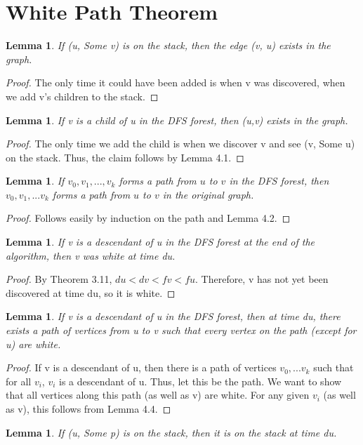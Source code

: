 \documentclass{article}
\newtheorem{lemma}[theorem]{Lemma}
\begin{document}
\section{White Path Theorem}
\begin{lemma}
If (u, Some v) is on the stack, then the edge (v, u) exists in the graph.
\end{lemma}
\begin{proof}
The only time it could have been added is when v was discovered, when we add v's children to the stack.
\end{proof}
\begin{lemma}
If v is a child of u in the DFS forest, then (u,v) exists in the graph.
\end{lemma}
\begin{proof}
The only time we add the child is when we discover v and see (v, Some u) on the stack. Thus, the claim follows by Lemma 4.1.
\end{proof}
\begin{lemma}
If $v_0, v_1,...,v_k$ forms a path from $u$ to $v$ in the DFS forest, then $v_0,v_1,...v_k$ forms a path from $u$ to $v$ in the original graph.
\end{lemma}
\begin{proof}
Follows easily by induction on the path and Lemma 4.2.
\end{proof}
\begin{lemma}
If v is a descendant of u in the DFS forest at the end of the algorithm, then v was white at time du.
\end{lemma}
\begin{proof}
By Theorem 3.11, $du < dv < fv < fu$. Therefore, v has not yet been discovered at time du, so it is white.
\end{proof}
\begin{lemma}
If v is a descendant of u in the DFS forest, then at time du, there exists a path of vertices from u to v such that every vertex on the path (except for u) are white.
\end{lemma}
\begin{proof}
If v is a descendant of u, then there is a path of vertices $v_0,...v_k$ such that for all $v_i$, $v_i$ is a descendant of u. Thus, let this be the path. We want to show that all vertices along this path (as well as v) are white. For any given $v_i$ (as well as v), this follows from Lemma 4.4.
\end{proof}
\begin{lemma}
If (u, Some p) is on the stack, then it is on the stack at time du.
\end{lemma}
\end{document}
